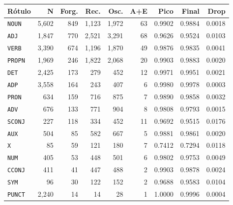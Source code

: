 \begin{table}[ht]
\begin{minipage}[t]{0.54\linewidth}
\end{minipage}
\hfill
\begin{minipage}[t]{0.42\linewidth}
\centering\tiny
\begin{tabular}{lrrrrrrrr}
\toprule
\textbf{Rótulo} & \textbf{N} & \textbf{Forg.} & \textbf{Rec.} & \textbf{Osc.} & \textbf{A+E} & \textbf{Pico} & \textbf{Final} & \textbf{Drop} \\
\midrule
\texttt{NOUN} & 5,602 & 849 & 1,123 & 1,972 & 63 & 0.9902 & 0.9884 & 0.0018 \\
\texttt{ADJ} & 1,847 & 770 & 2,521 & 3,291 & 68 & 0.9626 & 0.9524 & 0.0103 \\
\texttt{VERB} & 3,390 & 674 & 1,196 & 1,870 & 49 & 0.9876 & 0.9835 & 0.0041 \\
\texttt{PROPN} & 1,969 & 246 & 1,822 & 2,068 & 20 & 0.9903 & 0.9883 & 0.0020 \\
\texttt{DET} & 2,425 & 173 & 279 & 452 & 12 & 0.9971 & 0.9951 & 0.0021 \\
\texttt{ADP} & 3,558 & 164 & 243 & 407 & 6 & 0.9980 & 0.9978 & 0.0003 \\
\texttt{PRON} & 634 & 159 & 716 & 875 & 7 & 0.9890 & 0.9858 & 0.0032 \\
\texttt{ADV} & 676 & 133 & 771 & 904 & 8 & 0.9808 & 0.9793 & 0.0015 \\
\texttt{SCONJ} & 227 & 118 & 334 & 452 & 11 & 0.9692 & 0.9515 & 0.0176 \\
\texttt{AUX} & 504 & 85 & 582 & 667 & 5 & 0.9881 & 0.9861 & 0.0020 \\
\texttt{X} & 85 & 59 & 121 & 180 & 7 & 0.7412 & 0.7294 & 0.0118 \\
\texttt{NUM} & 405 & 53 & 448 & 501 & 6 & 0.9802 & 0.9753 & 0.0049 \\
\texttt{CCONJ} & 411 & 41 & 447 & 488 & 2 & 0.9903 & 0.9878 & 0.0024 \\
\texttt{SYM} & 96 & 30 & 122 & 152 & 2 & 0.9688 & 0.9583 & 0.0104 \\
\texttt{PUNCT} & 2,240 & 14 & 14 & 28 & 1 & 1.0000 & 0.9996 & 0.0004 \\
\bottomrule
\end{tabular}
\end{minipage}
\end{table}


